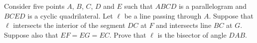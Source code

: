 Consider five points $ A$,  $ B$,  $ C$,  $ D$ and $ E$ such that $ ABCD$ is a parallelogram and $ BCED$ is a cyclic quadrilateral. Let $ \ell$ be a line passing through $ A$. Suppose that $ \ell$ intersects the interior of the segment $ DC$ at $ F$ and intersects line $ BC$ at $ G$. Suppose also that $ EF = EG = EC$. Prove that $ \ell$ is the bisector of angle $ DAB$.